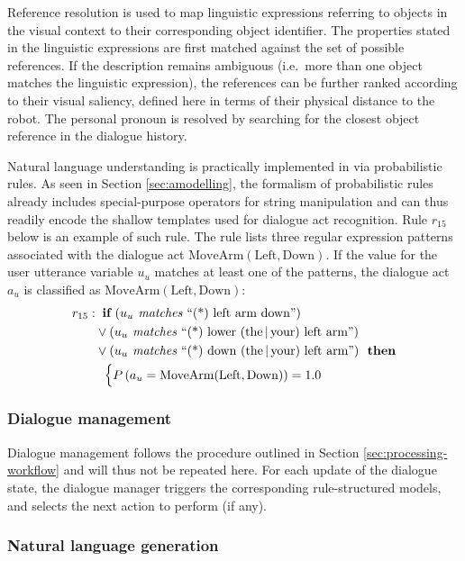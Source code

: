 Reference resolution is used to map linguistic expressions referring to objects in the visual context to their corresponding object identifier. The properties stated in the linguistic expressions are first matched against the set of possible references.  If the description remains ambiguous (i.e.\ more than one object matches the linguistic expression), the references can be further ranked according to their visual saliency, defined here in terms of their physical distance to the robot.  The personal pronoun  is resolved by searching for the closest object reference in the dialogue history. 

Natural language understanding is practically implemented in \opendial{} via probabilistic rules.  As seen in Section \ref{sec:amodelling}, the formalism of probabilistic rules already includes special-purpose operators for string manipulation and can thus readily encode the shallow templates used for dialogue act recognition.  Rule $r_{15}$ below is an example of such rule.  The rule lists three regular expression patterns associated with the dialogue act $\mathrm{MoveArm(Left,Down)}$.  If the value for the user utterance variable $u_u$ matches at least one of the patterns, the dialogue act $a_u$ is classified as $\mathrm{MoveArm(Left,Down)}$:
\begin{align*}
r_{15}: &\;\;\textbf{if} \ (u_u \textit{ matches } \text{``(*) left arm down''} ) \\ 
& \lor (u_u \textit{ matches } \text{``(*) lower (the\,|\,your) left arm''} ) \\
& \lor (u_u \textit{ matches } \text{``(*) down (the\,|\,your) left arm''}   )  \ \ \textbf{then} \\ 
& \; \; \begin{cases} P\left(a_u = \mathrm{MoveArm(Left,Down)}\right) = 1.0 \end{cases}
\end{align*}

\subsubsection*{Dialogue management}

Dialogue management follows the procedure outlined in Section \ref{sec:processing-workflow} and will thus not be repeated here. For each update of the dialogue state, the dialogue manager triggers the corresponding rule-structured models, and selects the next action to perform (if any). 

\subsubsection*{Natural language generation}

